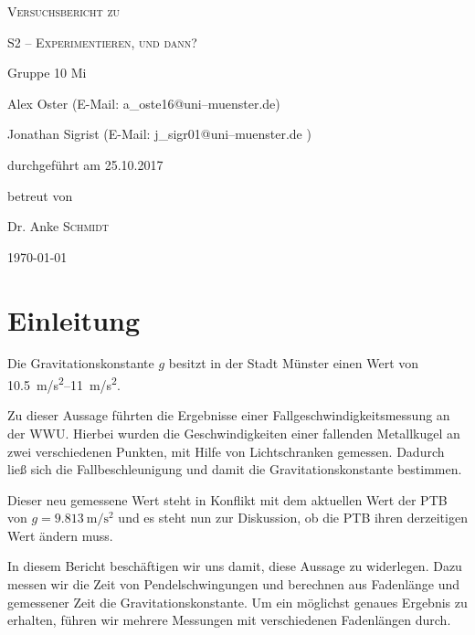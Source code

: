 \documentclass[11pt,a4paper,titlepage, ngerman]{article}
\begin{document}
	
	\begin{titlepage}
		\centering
		{\scshape\LARGE Versuchsbericht zu \par}
		\vspace{1cm}
		{\scshape\huge S2 -- Experimentieren, und dann?\par}
		\vspace{2.5cm}
		{\LARGE Gruppe 10 Mi\par}
		\vspace{0.5cm}
		{\large Alex Oster (E-Mail: a\_oste16@uni--muenster.de) \par}
		{\large Jonathan Sigrist (E-Mail: j\_sigr01@uni--muenster.de ) \par}
		\vfill
		durchgeführt am 25.10.2017\par
		betreut von\par
		{\large Dr. Anke \textsc{Schmidt}}
		
		\vfill
		
		{\large \today\par}
	\end{titlepage}
		
	\tableofcontents
	
	\newpage
	
	\section{Einleitung}
		\label{Einleitung}
		
		
		\glqq Die Gravitationskonstante $g$ besitzt in der Stadt Münster einen Wert von \SIrange{10,5}{11}{m/s^2}.\grqq
		
		Zu dieser Aussage führten die Ergebnisse einer Fallgeschwindigkeitsmessung an der WWU.
		Hierbei wurden die Geschwindigkeiten einer fallenden Metallkugel an zwei verschiedenen Punkten, mit Hilfe von Lichtschranken gemessen. Dadurch ließ sich die Fallbeschleunigung und damit die Gravitationskonstante bestimmen.
		
		Dieser neu gemessene Wert steht in Konflikt mit dem aktuellen Wert der PTB von $g = \SI{9.813}{\meter\per\second\squared}$ und es steht nun zur Diskussion, ob die PTB ihren derzeitigen Wert ändern muss.
		
		In diesem Bericht beschäftigen wir uns damit, diese Aussage zu widerlegen.
		Dazu messen wir die Zeit von Pendelschwingungen und berechnen aus Fadenlänge und gemessener Zeit die Gravitationskonstante. Um ein möglichst genaues Ergebnis zu erhalten, führen wir mehrere Messungen mit verschiedenen Fadenlängen durch.
		
\end{document}
